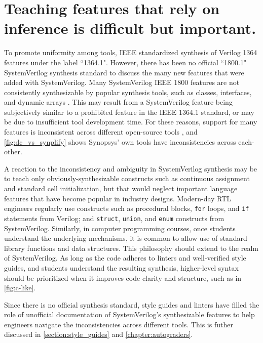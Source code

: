 \FloatBarrier

\section{Teaching features that rely on inference is difficult but important.}



To promote uniformity among tools, IEEE standardized synthesis of Verilog 1364 features under the label ``1364.1". However, there has been no official ``1800.1" SystemVerilog synthesis standard to discuss the many new features that were added with SystemVerilog. Many SystemVerilog IEEE 1800 features are not consistently synthesizable by popular synthesis tools, such as classes, interfaces, and dynamic arrays \cite{1800-2017, sutherland}. This may result from a SystemVerilog feature being subjectively similar to a prohibited feature in the IEEE 1364.1 standard, or may be due to insufficient tool development time. For these reasons, support for many features is inconsistent across different open-source tools \cite{svtests}, and \autoref{fig:dc_vs_synplify} shows Synopsys' own tools have inconsistencies across each-other.



A reaction to the inconsistency and ambiguity in SystemVerilog synthesis may be to teach only obviously-synthesizable constructs such as continuous assignment and standard cell initialization, but that would neglect important language features that have become popular in industry designs. Modern-day RTL engineers regularly use constructs such as procedural blocks, \texttt{for} loops, and \texttt{if} statements from Verilog; and \texttt{struct}, \texttt{union}, and \texttt{enum} constructs from SystemVerilog. Similarly, in computer programming courses, once students understand the underlying mechanisms, it is common to allow use of standard library functions and data structures. This philosophy should extend to the realm of SystemVerilog. As long as the code adheres to linters and well-verified style guides, and students understand the resulting synthesis, higher-level syntax should be prioritized when it improves code clarity and structure, such as in \autoref{fig:c-like}.

Since there is no official synthesis standard, style guides and linters have filled the role of unofficial documentation of SystemVerilog's synthesizable features to help engineers navigate the inconsistencies across different tools. This is futher discussed in \autoref{section:style_guides} and \autoref{chapter:autograders}.

